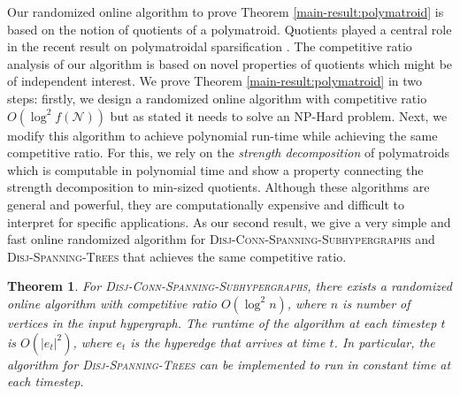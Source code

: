 \documentclass[11pt]{article}
\newtheorem{theorem}{Theorem}
\theoremstyle{definition}
\newcommand{\calN}{{\mathcal{N}}}
\newcommand{\knote}[1]{{\bf{\color{blue}[\tiny Karthik: #1]}}}
\newcommand{\DST}{\textsc{Disj-Spanning-Trees}\xspace}
\newcommand{\DCSS}{\textsc{Disj-Conn-Spanning-Subhypergraphs}\xspace}
\begin{document}
Our randomized online algorithm to prove Theorem \ref{main-result:polymatroid} is based on the notion of quotients of a polymatroid. Quotients played a central role in the recent result on polymatroidal sparsification \cite{quanrud2024quotient}. The competitive ratio analysis of our algorithm is based on novel properties of quotients 
which might be of independent interest. We prove Theorem \ref{main-result:polymatroid} in two steps: firstly, we design a randomized online algorithm with competitive ratio $O(\log^2{f(\calN)})$ but as stated it needs to solve an NP-Hard problem. Next, we modify this algorithm to achieve polynomial run-time while achieving the same competitive ratio. For this, we rely on the \emph{strength decomposition} of polymatroids which is computable in polynomial time and show a property connecting the strength decomposition to min-sized quotients. 
Although these algorithms are general and powerful, they are computationally expensive and difficult to interpret for specific applications.
As our second result, we give a very simple and fast online randomized algorithm for \DCSS and \DST that achieves the same competitive ratio. 

\iffalse
\knote{Edit the next paragraph.}
We also consider the special case where the given polymatroid $f$ is related to hypergraphs. The input to the problem is a hypergraph $G=(V,E)$ consisting of $n=|V|$ nodes and $m=|E|$ hyperedges, where each hyperedge is a non-empty subset of $V$. For every subset $A\subseteq E$ of hyperedges, let $c(A)$ be the number of connected components in the subhypergraph $(V,A)$ and define $f(A):=n-c(A)$. We can check that $f$ is a polymatroid on $E$ and a base of the polymatroid corresponds to a connected subhypergraph. The goal is to find a color assignment $C: E \rightarrow \mathbb{Z}_+$, which maximizes the number of proper colors $c\in \mathbb{Z}_+$. This problem is called the \emph{Disjoint Connected Spanning Hypergraphs} problem. Theorem~\ref{main-result:polymatroid} implies a randomized online algorithm for this problem with competitive ratio $O(\log^2 n)$. We further show that there is a faster randomized online algorithm with the same competitive ratio.
\knote{Deemphasize run-time. Emphasize that the algorithm in the abstract setting is non-trivial. }
\fi

\begin{theorem}\label{main-result:hypergaph}
    For \DCSS, there exists a randomized online algorithm with competitive ratio $O(\log^2 n)$, where $n$ is number of vertices in the input hypergraph. The runtime of the algorithm at each timestep $t$ is $O(|e_t|^2)$, where $e_t$ is the hyperedge that arrives at time $t$. In particular, the algorithm for \DST can be implemented to run in constant time at each timestep. 
\end{theorem}
\end{document}
